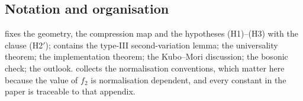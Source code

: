 \subsection*{Notation and organisation}

 fixes the geometry, the compression map and the hypotheses (H1)--(H3)
with the clause (H2$'$);  contains the type-III second-variation lemma;
 the universality theorem;  the implementation theorem;
 the Kubo--Mori discussion;  the bosonic check;
 the outlook.   collects the normalisation conventions,
which matter here because the value of $f_2$ is normalisation dependent, and every constant
in the paper is traceable to that appendix.
